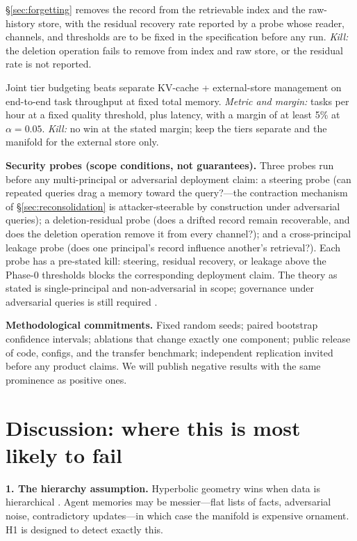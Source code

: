 \documentclass[11pt,a4paper]{article}
\begin{document}
\begin{description}[leftmargin=*]
\S\ref{sec:forgetting} removes the record from the retrievable index and
the raw-history store, with the residual recovery rate reported by a
probe whose reader, channels, and thresholds are to be fixed in the
specification before any run. \emph{Kill:} the deletion operation fails to remove from
index and raw store, or the residual rate is not reported.
\item[H5 (unified budget).] Joint tier budgeting beats separate
KV-cache + external-store management on end-to-end task throughput at
fixed total memory. \emph{Metric and margin:} tasks per hour at a fixed
quality threshold, plus latency, with a margin of at least 5\% at
$\alpha = 0.05$. \emph{Kill:} no win at the stated margin; keep the tiers
separate and the manifold for the external store only.
\end{description}

\textbf{Security probes (scope conditions, not guarantees).} Three probes
run before any multi-principal or adversarial deployment claim: a steering
probe (can repeated queries drag a memory toward the query?---the
contraction mechanism of \S\ref{sec:reconsolidation} is attacker-steerable
by construction under adversarial queries); a deletion-residual probe
(does a drifted record remain recoverable, and does the deletion operation
remove it from every channel?); and a cross-principal leakage probe (does
one principal's record influence another's retrieval?). Each probe has a
pre-stated kill: steering, residual recovery, or leakage above the
Phase-0 thresholds blocks the corresponding deployment claim. The theory
as stated is single-principal and non-adversarial in scope; governance
under adversarial queries is still required \cite{epistemics}.

\textbf{Methodological commitments.} Fixed random seeds; paired bootstrap
confidence intervals; ablations that change exactly one component; public
release of code, configs, and the transfer benchmark; independent
replication invited before any product claims. We will publish negative
results with the same prominence as positive ones.

\section{Discussion: where this is most likely to fail}
\label{sec:failure}

\textbf{1. The hierarchy assumption.} Hyperbolic geometry wins when data
is hierarchical \cite{nickel2017}. Agent memories may be messier---flat
lists of facts, adversarial noise, contradictory updates---in which case
the manifold is expensive ornament. H1 is designed to detect exactly this.
\end{document}
